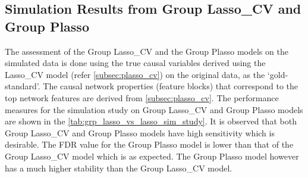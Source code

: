 \subsection{Simulation Results from Group Lasso\_CV and Group Plasso} \label{subsec:simstudy_grplasso}
The assessment of the Group Lasso\_CV and the Group Plasso models on the simulated data is done using the true causal variables derived using the Lasso\_CV model (refer \autoref{subsec:plasso_cv}) on the original data, as the \lq gold-standard'. The causal network properties (feature blocks) that correspond to the top network features are derived from \autoref{subsec:plasso_cv}. The performance measures for the simulation study on Group Lasso\_CV and Group Plasso models are shown in the \autoref{tab:grp_lasso_vs_lasso_sim_study}. It is observed that both Group Lasso\_CV and Group Plasso models have high sensitivity which is desirable. The FDR value for the Group Plasso model is lower than that of the Group Lasso\_CV model which is as expected. The Group Plasso model however has a much higher stability than the Group Lasso\_CV model.\\

\begin{table}[H]
\caption{Performance measures of Group Lasso\_CV and Group Plasso models.}
\label{tab:grp_lasso_vs_lasso_sim_study}
\end{table}

